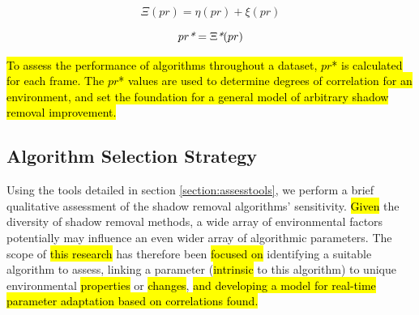 \documentclass[12pt]{report}
\begin{document}
\begin{equation}
\Xi(pr) = \eta(pr) + \xi(pr)
\label{eqn:score}
\end{equation}

\begin{equation}
pr\emph{*} = \Xi\emph{*}(pr)
\end{equation}

\hl{To assess the performance of algorithms throughout a dataset, $pr$* is calculated for each frame. The $pr$* values are used to determine degrees of correlation for an environment, and set the foundation for a general model of arbitrary shadow removal improvement.}

\subsection{Algorithm Selection Strategy} \label{section:selectalgorithm}

Using the tools detailed in section \ref{section:assesstools}, we perform a brief qualitative assessment of the shadow removal algorithms' sensitivity. \hl{Given} the diversity of shadow removal methods, a wide array of environmental factors potentially may influence an even wider array of algorithmic parameters. The scope of \hl{this research} has therefore been \hl{focused on} identifying a suitable algorithm to assess, linking a parameter (\hl{intrinsic} to this algorithm) to unique environmental \hl{properties} or \hl{changes}, \hl{and developing a model for real-time parameter adaptation based on correlations found.}

\end{document}
